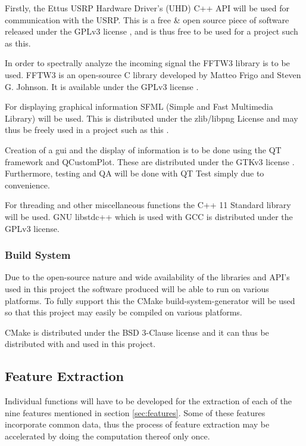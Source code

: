 \documentclass[10pt,twocolumn]{witseiepaper}
\begin{document}
			Firstly, the Ettus USRP Hardware Driver's (UHD) C++ API will be used for communication with the USRP. This is a free \& open source piece of software released under the GPLv3 license \cite{uhd_license}, and is thus free to be used for a project such as this.

			In order to spectrally analyze the incoming signal the FFTW3 library is to be used. FFTW3 is an open-source C library developed by Matteo Frigo and Steven G. Johnson. It is available under the GPLv3 license \cite{fftw3_license}.

			For displaying graphical information SFML (Simple and Fast Multimedia Library) will be used. This is distributed under the zlib/libpng License and may thus be freely used in a project such as this \cite{sfml_license}.

			Creation of a gui and the display of information is to be done using the QT framework and QCustomPlot. These are distributed under the GTKv3 license \cite{qt_license, qcustomplot_license}. Furthermore, testing and QA will be done with QT Test simply due to convenience.

			For threading and other miscellaneous functions the C++ 11 Standard library will be used. GNU libstdc++ which is used with GCC is distributed under the GPLv3 license.

		\subsubsection{Build System}
			Due to the open-source nature and wide availability of the libraries and API's used in this project the software produced will be able to run on various platforms. To fully support this the CMake build-system-generator will be used so that this project may easily be compiled on various platforms.

			CMake is distributed under the BSD 3-Clause license \cite{cmake_license} and it can thus be distributed with and used in this project.

	\subsection{Feature Extraction}
		\label{sec:feat_fun}
		Individual functions will have to be developed for the extraction of each of the nine features mentioned in section \ref{sec:features}. Some of these features incorporate common data, thus the process of feature extraction may be accelerated by doing the computation thereof only once.
\end{document}
